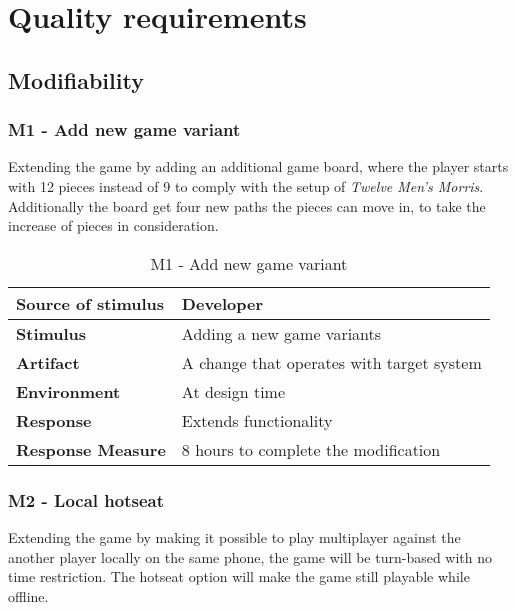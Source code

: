 \newpage

\section{Quality requirements}

\subsection{Modifiability}
\label{section:quality_mod}

\subsubsection{M1 - Add new game variant}

Extending the game by adding an additional game board, where the player starts with 12 pieces instead of 9 to comply  with the setup of \emph{Twelve Men's Morris}. Additionally the board get four new paths the pieces can move in, to take the increase of pieces in consideration.

\begin{table}[h!]
\begin{tabular}{ | p{110pt} | p{250pt}  |}
\hline
\bf Source of stimulus &  Developer  \\ \hline
\bf Stimulus & Adding a new game variants \\ \hline 
\bf Artifact & A change that operates with target system  \\  \hline
\bf Environment & At design time \\ \hline
\bf Response & Extends functionality \\ \hline
\bf Response Measure & 8 hours to complete the modification \\ \hline

\end{tabular}
\caption{M1 - Add new game variant}
\end{table}

\pagebreak

\subsubsection{M2 - Local hotseat}

Extending the game by making it possible to play multiplayer against the another player locally on the same phone, the game will be turn-based with no time restriction. The hotseat option will make the game still playable while offline.

